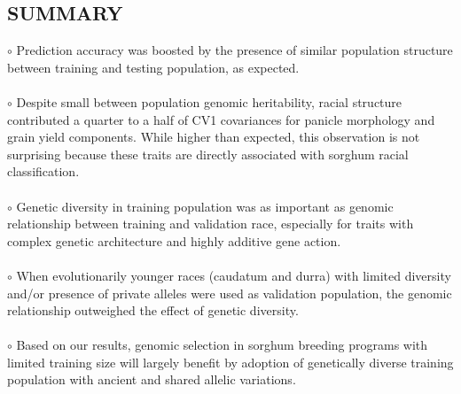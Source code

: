 \documentclass[a0,portrait]{a0poster}
\begin{document}
\begin{minipage}[c]{\linewidth}
\begin{framed}
\begin{multicols}{2}
{{\section*{SUMMARY}
\hspace{0.1cm}$\circ$ Prediction accuracy was boosted by the presence of similar population structure between training and testing population, as expected.\\\\
\hspace{0.1cm}$\circ$ Despite small between population genomic heritability, racial structure contributed a quarter to a half of CV1 covariances for panicle morphology and grain yield components. While higher than expected, this observation is not surprising because these traits are directly associated with sorghum racial classification. \\\\
\hspace{0.1cm}$\circ$ Genetic diversity in training population was as important as genomic relationship between training and validation race, especially for traits with complex genetic architecture and highly additive gene action. \\\\
\hspace{0.1cm}$\circ$ When evolutionarily younger races (caudatum and durra) with limited diversity and/or presence of private alleles were used as validation population, the genomic relationship outweighed the effect of genetic diversity.\\\\
\hspace{0.1cm}$\circ$ Based on our results, genomic selection in sorghum breeding programs with limited training size will largely benefit by adoption of genetically diverse training population with ancient and shared allelic variations.
}}
\vspace{-0.5cm}
\color{Black}
\fontsize{20}{25} \selectfont 

\vspace{-0.5cm}

\end{multicols}
\end{framed}
\end{minipage}
\end{document}
